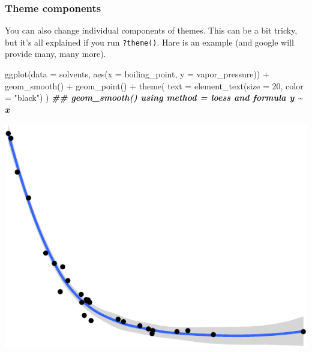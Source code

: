 \documentclass[
]{krantz}
\newenvironment{Shaded}{\begin{snugshade}}{\end{snugshade}}
\newcommand{\AttributeTok}[1]{\textcolor[rgb]{0.77,0.63,0.00}{#1}}
\newcommand{\DecValTok}[1]{\textcolor[rgb]{0.00,0.00,0.81}{#1}}
\newcommand{\DocumentationTok}[1]{\textcolor[rgb]{0.56,0.35,0.01}{\textbf{\textit{#1}}}}
\newcommand{\FunctionTok}[1]{\textcolor[rgb]{0.00,0.00,0.00}{#1}}
\newcommand{\NormalTok}[1]{#1}
\newcommand{\SpecialCharTok}[1]{\textcolor[rgb]{0.00,0.00,0.00}{#1}}
\newcommand{\StringTok}[1]{\textcolor[rgb]{0.31,0.60,0.02}{#1}}
\begin{document}
\hypertarget{theme-components}{%
\subsubsection{Theme components}\label{theme-components}}

You can also change individual components of themes. This can be a bit tricky, but it's all explained if you run \texttt{?theme()}. Hare is an example (and google will provide many, many more).

\begin{Shaded}
\begin{Highlighting}[]
\FunctionTok{ggplot}\NormalTok{(}\AttributeTok{data =}\NormalTok{ solvents, }\FunctionTok{aes}\NormalTok{(}\AttributeTok{x =}\NormalTok{ boiling\_point, }\AttributeTok{y =}\NormalTok{ vapor\_pressure)) }\SpecialCharTok{+} 
  \FunctionTok{geom\_smooth}\NormalTok{() }\SpecialCharTok{+}
  \FunctionTok{geom\_point}\NormalTok{() }\SpecialCharTok{+}
  \FunctionTok{theme}\NormalTok{(}
    \AttributeTok{text =} \FunctionTok{element\_text}\NormalTok{(}\AttributeTok{size =} \DecValTok{20}\NormalTok{, }\AttributeTok{color =} \StringTok{"black"}\NormalTok{)}
\NormalTok{  )}
\DocumentationTok{\#\# \textasciigrave{}geom\_smooth()\textasciigrave{} using method = \textquotesingle{}loess\textquotesingle{} and formula \textquotesingle{}y \textasciitilde{} x\textquotesingle{}}
\end{Highlighting}
\end{Shaded}

\begin{center}\includegraphics{index_files/figure-latex/unnamed-chunk-65-1} \end{center}
\end{document}
